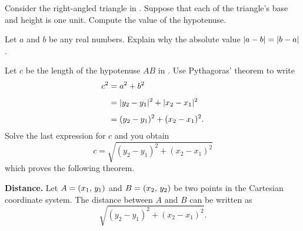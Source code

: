 \documentclass[a4paper,oneside,12pt]{article}
\begin{document}
\begin{exercise}
Consider the right-angled triangle in
.  Suppose that each of the
triangle's base and height is one unit.  Compute the value of the
hypotenuse.
\end{exercise}

\begin{exercise}
Let $a$ and $b$ be any real numbers.  Explain why the absolute value
$\lvert a - b\rvert = \lvert b - a\rvert$.
\end{exercise}


Let $c$ be the length of the hypotenuse $AB$ in
.  Use Pythagoras' theorem to
write
\begin{align*}
c^2
&=
a^2 + b^2 \\[4pt]
&=
\lvert y_2 - y_1\rvert^2 + \lvert x_2 - x_1\rvert^2 \\[4pt]
&=
(y_2 - y_1)^2 + (x_2 - x_1)^2.
\end{align*}
Solve the last expression for $c$ and you obtain
\[
c
=
\sqrt{
  (y_2 - y_1)^2
  +
  (x_2 - x_1)^2
}
\]
which proves the following theorem.

\begin{theorem}
\label{thm:distance_between_two_points}
\textbf{Distance.}
Let $A = \left\lparen{x_1},\, {y_1}\right\rparen$ and $B = \left\lparen{x_2},\, {y_2}\right\rparen$ be two points in
the Cartesian coordinate system.  The distance between $A$ and $B$ can
be written as
\[
\sqrt{
  (y_2 - y_1)^2
  +
  (x_2 - x_1)^2
}.
\]
\end{theorem}
\end{document}
